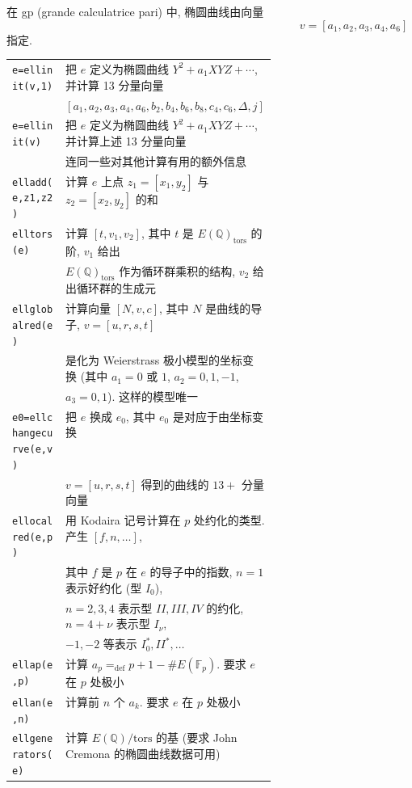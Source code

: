 在 gp (grande calculatrice pari) 中, 椭圆曲线由向量
\[
v = [a_1, a_2, a_3, a_4, a_6]
\]
指定.

\begin{center}
\renewcommand{\arraystretch}{1.35}
\begin{tabular}{@{}p{0.38\linewidth}p{}@{}}
\texttt{e=ellinit(v,1)} & 把 $e$ 定义为椭圆曲线 $Y^2 + a_1XYZ + \cdots$, 并计算 13 分量向量\\
& $[a_1,\allowbreak a_2,\allowbreak a_3,\allowbreak a_4,\allowbreak a_6,\allowbreak b_2,\allowbreak b_4,\allowbreak b_6,\allowbreak b_8,\allowbreak c_4,\allowbreak c_6,\allowbreak \Delta,\allowbreak j]$\\
\texttt{e=ellinit(v)} & 把 $e$ 定义为椭圆曲线 $Y^2 + a_1XYZ + \cdots$, 并计算上述 13 分量向量\\
& 连同一些对其他计算有用的额外信息\\
\texttt{elladd(e,z1,z2)} & 计算 $e$ 上点 $z_1 = [x_1, y_2]$ 与 $z_2 = [x_2, y_2]$ 的和\\
\texttt{elltors(e)} & 计算 $[t, v_1, v_2]$, 其中 $t$ 是 $E(\mathbb{Q})_{\mathrm{tors}}$ 的阶, $v_1$ 给出\\
& $E(\mathbb{Q})_{\mathrm{tors}}$ 作为循环群乘积的结构, $v_2$ 给出循环群的生成元\\
\texttt{ellglobalred(e)} & 计算向量 $[N, v, c]$, 其中 $N$ 是曲线的导子, $v = [u, r, s, t]$\\
& 是化为 Weierstrass 极小模型的坐标变换 (其中 $a_1 = 0$ 或 $1$, $a_2 = 0, 1, -1$,\\
& $a_3 = 0, 1$). 这样的模型唯一\\
\texttt{e0=ellchangecurve(e,v)} & 把 $e$ 换成 $e_0$, 其中 $e_0$ 是对应于由坐标变换\\
& $v = [u, r, s, t]$ 得到的曲线的 $13{+}$ 分量向量\\
\texttt{ellocalred(e,p)} & 用 Kodaira 记号计算在 $p$ 处约化的类型. 产生 $[f, n, \dots]$,\\
& 其中 $f$ 是 $p$ 在 $e$ 的导子中的指数, $n = 1$ 表示好约化 (型 $I_0$),\\
& $n = 2, 3, 4$ 表示型 $II, III, IV$ 的约化, $n = 4+\nu$ 表示型 $I_\nu$,\\
& $-1, -2$ 等表示 $I_0^*, II^*, \dots$\\
\texttt{ellap(e,p)} & 计算 $a_p \mathrel{=_{\mathrm{def}}} p + 1 - \#E(\mathbb{F}_p)$. 要求 $e$ 在 $p$ 处极小\\
\texttt{ellan(e,n)} & 计算前 $n$ 个 $a_k$. 要求 $e$ 在 $p$ 处极小\\
\texttt{ellgenerators(e)} & 计算 $E(\mathbb{Q})/\mathrm{tors}$ 的基 (要求 John Cremona 的椭圆曲线数据可用)
\end{tabular}
\end{center}

